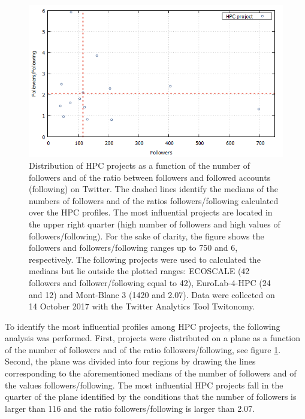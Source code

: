 \begin{figure}[!t] 
 \begin{center}
 \includegraphics[scale=0.5]{Images/HPC_influence.png}
 \caption{Distribution of HPC projects as a function of the number of followers and of the ratio between followers and followed accounts (following) on Twitter. The dashed lines identify the medians of the numbers of followers and of the ratios followers/following calculated over the HPC profiles. The most influential projects are located in the upper right quarter (high number of followers and high values of followers/following). For the sake of clarity, the figure shows the followers and followers/following ranges up to 750 and 6, respectively. The following projects were used to calculated the medians but lie outside the plotted ranges: ECOSCALE (42 followers and follower/following equal to 42), EuroLab-4-HPC (24 and 12) and Mont-Blanc 3 (1420 and 2.07). Data were collected on 14 October 2017 with the Twitter Analytics Tool Twitonomy.}
 \label{HPC_influence_plot}
 \end{center}
\end{figure}

To identify the most influential profiles among HPC projects, the following analysis was performed. First, projects were distributed on a plane as a function of the number of followers and of the ratio followers/following, see figure \ref{HPC_influence_plot}. Second, the plane was divided into four regions by drawing the lines corresponding to the aforementioned medians of the number of followers and of the values followers/following. The most influential HPC projects fall in the quarter of the plane identified by the conditions that the number of followers is larger than 116 and the ratio followers/following is larger than 2.07.

